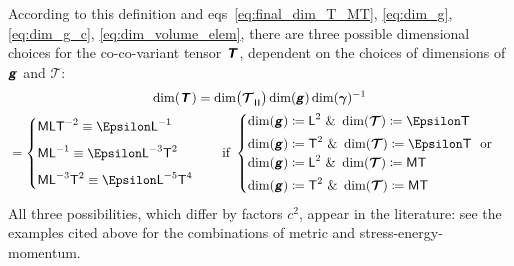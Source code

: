 \documentclass[\ifafour a4paper,12pt,\else a5paper,10pt,\fi%
onecolumn,oneside,article,%
british%
]{memoir}
\makeatletter
\theoremstyle{remark}
\theoremstyle{innote}
\newcommand*{\mathte}[1]{\textbf{\textit{\textsf{#1}}}}
\newcommand*{\amp}{\&}
\newcommand*{\defd}{\coloneqq}
\renewcommand*{\|}[1][]{\nonscript\,#1\vert\nonscript\;\mathopen{}}
\newcommand*{\sect}{\S}%
\newcommand*{\eqns}{eqs}%
\newcommand*{\q}{}%
\DeclareRobustCommand*{\q}{%
  \mathord{\mathpalette\bigcdot@{}}%
}
\newcommand*{\bigcdot@scalefactor}{0.7}
\newcommand*{\bigcdot@widthfactor}{1.5}
\newcommand*{\bigcdot@}[2]{%
  \sbox0{$#1\vcenter{}$}%
  \sbox2{$#1\cdot\m@th$}%
  \hbox to \bigcdot@widthfactor\wd2{%
    \hfil
    \raise\ht0\hbox{%
      \scalebox{\bigcdot@scalefactor}{%
        \lower\ht0\hbox{$#1\bullet\m@th$}%
      }%
    }%
    \hfil
  }%
}
\newcommand*{\Le}{\textsf{L}}
\newcommand*{\Ti}{\textsf{T}}
\newcommand*{\Ma}{\textsf{M}}
\newcommand*{\En}{\Epsilon}%
\newcommand*{\yg}{\mathte{g}}
\newcommand*{\yT}{\bm{\mathcal{T}}}
\newcommand*{\yTe}{\mathte{T}}
\renewcommand*{\i}{\indices}
\newcommand*{\ygv}{\bm{\gamma}}
\newcommand*{\rul}{{\mkern2mu\rule[-0.1ex]{0.75pt}{1.1ex}\mkern2mu}}
\DeclarePairedDelimiter\mul{\rul}{\rul}%
\makeatother
\begin{document}
According to this definition and \eqns~\eqref{eq:final_dim_T_MT},
\eqref{eq:dim_g}, \eqref{eq:dim_g_c}, \eqref{eq:dim_volume_elem}, there are
three possible dimensional choices for the co-co-variant tensor $\yTe$,
dependent on the choices of dimensions of $\yg$ and $\yT$:
\begin{multline}
\label{eq:dim_co_co_T}
\dim(\yTe\i{_{\q\q}}) =
\dim\bigl(\yT\i{_{\q \mul{\q\q\q}}}\bigr) \dim(\yg) \dim(\ygv)^{-1}
  \\{}=
  \begin{cases}
\Ma\Le\Ti^{-2} \equiv \En\Le^{-1} \\[2\jot]
\Ma\Le^{-1} \equiv \En\Le^{-3}\Ti^{2} \\[2\jot]
\Ma\Le^{-3}\Ti^{2} \equiv \En\Le^{-5}\Ti^{4}
  \end{cases}
  \quad\text{if }
  \begin{cases}
\dim(\yg)\defd \Le^2 \text{ \amp\ }\dim(\yT)\defd \En\Ti \\[\jot]
    \dim(\yg)\defd \Ti^2 \text{ \amp\ }\dim(\yT)\defd \En\Ti 
    \ \text{ or }\\
\dim(\yg)\defd \Le^2 \text{ \amp\ }\dim(\yT)\defd \Ma\Ti \\[\jot]
\dim(\yg)\defd \Ti^2 \text{ \amp\ }\dim(\yT)\defd \Ma\Ti
  \end{cases}
\end{multline}
All three possibilities, which differ by factors $c^{2}$, appear in the
literature: see the examples cited above for the combinations of metric and
stress-energy-momentum.

 


\end{document}
